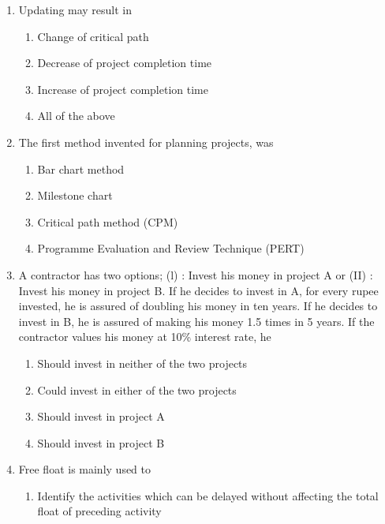 \documentclass[11pt,a4paper]{article}
\begin{document}
\begin{enumerate}
{ 3. Equal to Total Float. \\
 4. Less than Independent Float}
\begin{enumerate}[label=\Alph*.]
\item{1 and 4 are correct}
\item{2 and 3 are correct}
\item{1 and 4 are correct}
\item{1 and 2 are correct}
\end{enumerate}
\item{Updating may result in}
\begin{enumerate}[label=\Alph*.]
\item{Change of critical path}
\item{Decrease of project completion time}
\item{Increase of project completion time}
\item{All of the above}
\end{enumerate}
\item{The first method invented for planning projects, was}
\begin{enumerate}[label=\Alph*.]
\item{Bar chart method}
\item{Milestone chart}
\item{Critical path method (CPM)}
\item{Programme Evaluation and Review Technique (PERT)}
\end{enumerate}
\item{A contractor has two options; (l) : Invest his money in project A or (II) : Invest his money in project B. If he decides to invest in A, for every rupee invested, he is assured of doubling his money in ten years. If he decides to invest in B, he is assured of making his money 1.5 times in 5 years. If the contractor values his money at 10\% interest rate, he
}
\begin{enumerate}[label=\Alph*.]
\item{Should invest in neither of the two projects}
\item{Could invest in either of the two projects}
\item{Should invest in project A}
\item{Should invest in project B}
\end{enumerate}
\item{Free float is mainly used to}
\begin{enumerate}[label=\Alph*.]
\item{Identify the activities which can be delayed without affecting the total float of preceding activity}

\end{enumerate}
\end{enumerate}
\end{document}
